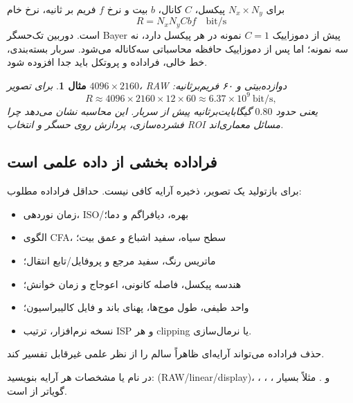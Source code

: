 \documentclass[12pt,openany,oneside]{book}
\newtheorem{example}{مثال}[chapter]
\begin{document}
برای \(N_x\times N_y\) پیکسل، \(C\) کانال، \(b\) بیت و نرخ \(f\) فریم بر ثانیه، نرخ خام
\begin{equation}
R=N_xN_yCbf\quad\text{bit/s}
\label{eq:data-rate}
\end{equation}
است. دوربین تک‌حسگر Bayer پیش از دموزاییک \(C=1\) نمونه در هر پیکسل دارد، نه سه نمونه؛ اما پس از
دموزاییک حافظه محاسباتی سه‌کاناله می‌شود. سربار بسته‌بندی، خط خالی، فراداده و پروتکل باید جدا افزوده
شود.

\begin{example}
برای تصویر \(4096\times2160\)، RAW دوازده‌بیتی و ۶۰ فریم‌برثانیه:
\begin{equation}
R\approx4096\times2160\times12\times60
\approx6.37\times10^9\ \text{bit/s},
\end{equation}
یعنی حدود \(0.80\) گیگابایت‌برثانیه پیش از سربار. این محاسبه نشان می‌دهد چرا فشرده‌سازی، پردازش
روی حسگر و انتخاب ROI مسائل معماری‌اند.
\end{example}

\subsection{فراداده بخشی از داده علمی است}

برای بازتولید یک تصویر، ذخیره آرایه کافی نیست. حداقل فراداده مطلوب:
\begin{itemize}
\item زمان نوردهی، ISO/بهره، دیافراگم و دما؛
\item الگوی CFA، سطح سیاه، سفید اشباع و عمق بیت؛
\item ماتریس رنگ، سفید مرجع و پروفایل/تابع انتقال؛
\item هندسه پیکسل، فاصله کانونی، اعوجاج و زمان خوانش؛
\item واحد طیفی، طول موج‌ها، پهنای باند و فایل کالیبراسیون؛
\item نسخه نرم‌افزار، ترتیب ISP و هر clipping یا نرمال‌سازی.
\end{itemize}
حذف فراداده می‌تواند آرایه‌ای ظاهراً سالم را از نظر علمی غیرقابل تفسیر کند.

\begin{keybox}
در نام یا مشخصات هر آرایه بنویسید:  (RAW/linear/display)، ،
، ،  و . مثلاً
 بسیار گویاتر از
 است.
\end{keybox}
\end{document}
